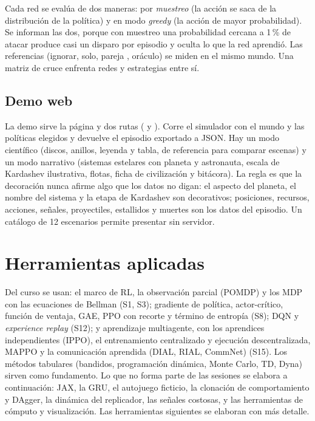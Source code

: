 \documentclass[11pt,a4paper]{article}
\newcommand{\codigo}[1]{\texttt{\detokenize{#1}}}
\begin{document}
Cada red se eval\'ua de dos maneras: por \emph{muestreo} (la acci\'on se saca de la distribuci\'on de la pol\'itica) y en modo \emph{greedy} (la acci\'on de mayor probabilidad). Se informan las dos, porque con muestreo una probabilidad cercana a 1\,\% de atacar produce casi un disparo por episodio y oculta lo que la red aprendi\'o. Las referencias (ignorar, solo, pareja \codigo{coop_real}, or\'aculo) se miden en el mismo mundo. Una matriz de cruce enfrenta redes y estrategias entre s\'i.

\subsection{Demo web}

La demo sirve la p\'agina y dos rutas (\codigo{/api/opciones} y \codigo{/api/simular}). Corre el simulador con el mundo y las pol\'iticas elegidos y devuelve el episodio exportado a JSON. Hay un modo cient\'ifico (discos, anillos, leyenda y tabla, de referencia para comparar escenas) y un modo narrativo (sistemas estelares con planeta y astronauta, escala de Kardashev ilustrativa, flotas, ficha de civilizaci\'on y bit\'acora). La regla es que la decoraci\'on nunca afirme algo que los datos no digan: el aspecto del planeta, el nombre del sistema y la etapa de Kardashev son decorativos; posiciones, recursos, acciones, se\~nales, proyectiles, estallidos y muertes son los datos del episodio. Un cat\'alogo de 12 escenarios permite presentar sin servidor.

\section{Herramientas aplicadas}

Del curso se usan: el marco de RL, la observaci\'on parcial (POMDP) y los MDP con las ecuaciones de Bellman (S1, S3); gradiente de pol\'itica, actor-cr\'itico, funci\'on de ventaja, GAE, PPO con recorte y t\'ermino de entrop\'ia (S8); DQN y \emph{experience replay} (S12); y aprendizaje multiagente, con los aprendices independientes (IPPO), el entrenamiento centralizado y ejecuci\'on descentralizada, MAPPO y la comunicaci\'on aprendida (DIAL, RIAL, CommNet) (S15). Los m\'etodos tabulares (bandidos, programaci\'on din\'amica, Monte Carlo, TD, Dyna) sirven como fundamento. Lo que no forma parte de las sesiones se elabora a continuaci\'on: JAX, la GRU, el autojuego ficticio, la clonaci\'on de comportamiento y DAgger, la din\'amica del replicador, las se\~nales costosas, y las herramientas de c\'omputo y visualizaci\'on. Las herramientas siguientes se elaboran con m\'as detalle.
\end{document}
